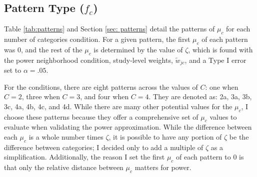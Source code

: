 \subsection{Pattern Type \texorpdfstring{($f_c$)}{ }} \label{sec: Pattern Type}


Table \ref{tab:patterns} and Section \ref{sec: patterns} detail the patterns of $\mu_c$ for each number of categories condition. For a given pattern, the first $\mu_c$ of each pattern was 0, and the rest of the $\mu_c$ is determined by the value of $\zeta$, which is found with the power neighborhood condition, study-level weights, $\tilde{w}_{jc}$, and a Type I error set to $\alpha = .05$. 

For the conditions, there are eight patterns across the values of $C$: one when $C = 2$, three when $C = 3$, and four when $C = 4$. They are denoted as:  2a, 3a, 3b, 3c, 4a, 4b, 4c, and 4d.  While there are many other potential values for the $\mu_c$, I choose these patterns because they offer a comprehensive set of $\mu_c$ values to evaluate when validating the power approximation. While the difference between each $\mu_c$ is a whole number times $\zeta$, it is possible to have any portion of $\zeta$ be the difference between categories; I decided only to add a multiple of $\zeta$ as a simplification. Additionally, the reason I set the first $\mu_c$ of each pattern to $0$ is that only the relative distance between $\mu_c$ matters for power. 





